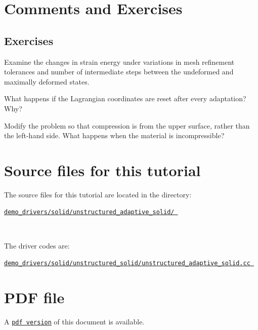  

\hypertarget{index_comm_ex}{}\section{Comments and Exercises}\label{index_comm_ex}
\hypertarget{index_ex}{}\subsection{Exercises}\label{index_ex}

\begin{DoxyEnumerate}
\item Examine the changes in strain energy under variations in mesh refinement tolerances and number of intermediate steps between the undeformed and maximally deformed states.
\item What happens if the Lagrangian coordinates are reset after every adaptation? Why?
\item Modify the problem so that compression is from the upper surface, rather than the left-\/hand side. What happens when the material is incompressible?
\end{DoxyEnumerate}



 

\hypertarget{index_sources}{}\section{Source files for this tutorial}\label{index_sources}

\begin{DoxyItemize}
\item The source files for this tutorial are located in the directory\+:~\newline
~\newline
\begin{center} \href{../../../../demo_drivers/solid/unstructured_adaptive_solid/}{\tt demo\+\_\+drivers/solid/unstructured\+\_\+adaptive\+\_\+solid/ } \end{center} ~\newline

\item The driver codes are\+: ~\newline
~\newline
\begin{center} \href{../../../../demo_drivers/solid/unstructured_adaptive_solid/unstructured_adaptive_solid.cc}{\tt demo\+\_\+drivers/solid/unstructured\+\_\+solid/unstructured\+\_\+adaptive\+\_\+solid.\+cc } \end{center} 
\end{DoxyItemize}



 

 \hypertarget{index_pdf}{}\section{P\+D\+F file}\label{index_pdf}
A \href{../latex/refman.pdf}{\tt pdf version} of this document is available. 
